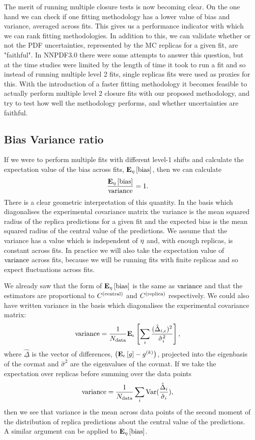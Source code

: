The merit of running multiple closure tests is now becoming clear. On the one
hand we can check if one fitting methodology has a lower value of bias and
variance, averaged across fits. This gives us a performance indicator with
which we can rank fitting methodologies. In addition to this, we can validate
whether or not the PDF uncertainties, represented by the MC replicas for a given
fit, are "faithful". In NNPDF3.0 there were some attempts to answer this question,
but at the time studies were limited by the length of time it took to run a fit
and so instead of running multiple level 2 fits, single replicas fits were used
as proxies for this.
With the introduction of a faster fitting methodology it becomes feasible to
actually perform multiple level 2 closure fits with our proposed methodology,
and try to test how well the methodology performs, and whether uncertainties
are faithful.

\subsection{Bias Variance ratio}

If we were to perform multiple fits with different level-1
shifts and calculate the expectation value of the bias across fits,
$\mathbf{E}_{\eta}\left[ {\rm bias} \right]$, then we can calculate
\begin{equation}
    \label{eq:BiasVarRatio}
    \frac{\mathbf{E}_{\eta}\left[ {\rm bias} \right]}{{\rm variance}} = 1.
\end{equation}
There is a clear geometric interpretation of this quantity.
In the basis which diagonalises the experimental
covariance matrix the variance is the mean squared radius of the replica predictions for a
given fit and the expected bias is the mean squared radius of the central value
of the predictions. We assume that the variance has a value which is
independent of $\eta$ and, with enough replicas, is constant across fits.
In practice we will also take the expectation value of ${\rm variance}$ across fits,
because we will be running fits with finite replicas and so expect fluctuations
across fits.

We already saw that the form of $\mathbf{E}_{\eta}\left[ {\rm bias} \right]$ is the same as ${\rm variance}$ and that
the estimators are proportional to $C^{(\rm central)}$ and $C^{(\rm replica)}$ respectively.
We could also have written variance in the basis which diagonalises the
experimental covariance matrix:
\begin{equation}
    {\rm variance} = \frac{1}{N_{\rm data}} \mathbf{E}_{\epsilon}\left[  \sum_{i} \frac{(\hat{\Delta}_{i, \epsilon})^2}{\hat{\sigma}_{i}^2} \right],
\end{equation}
where $\underline{\hat{\Delta}}$ is the vector of differences, $\left( \mathbf{E}_{\epsilon}\left[ g \right] - g^{(k)}\right)$,
projected into the eigenbasis of the covmat and $\hat{\sigma}^2$ are the
eigenvalues of the covmat. If we take the expectation over replicas before
summing over the data points
\begin{equation}
    {\rm variance} = \frac{1}{N_{\rm data}} \sum_{i} {\rm Var}(\frac{\hat{\Delta}_i}{\hat{\sigma}_i}),
\end{equation}
then we see that variance is the mean across data points of the second moment
of the distribution of replica predictions about the central value of the predictions.
A similar argument can be applied to $\mathbf{E}_{\eta}\left[ {\rm bias} \right]$.

